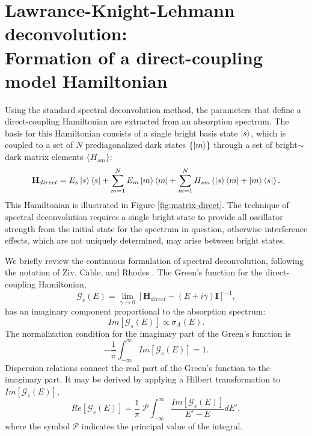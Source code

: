 \documentclass[12pt]{mitthesis}
\begin{document}
\section{Lawrance-Knight-Lehmann deconvolution: \\
  Formation of a direct-coupling model Hamiltonian}

Using the standard spectral deconvolution method, the parameters that define a direct-coupling
Hamiltonian are extracted from an absorption spectrum.  The basis for
this Hamiltonian consists of a single bright basis state $\mathinner{|{s}\rangle}$,
which is coupled to a set of $N$ prediagonalized dark states $\lbrace
\mathinner{|{m}\rangle} \rbrace$ through a set of bright$\sim$dark matrix elements
$\lbrace H_{sm} \rbrace$:
\begin{equation}
  \mathbf{H}_{direct} = 
  E_s\mathinner{|{s}\rangle}\mathinner{\langle{s}|} 
  + \sum_{m=1}^N E_m\mathinner{|{m}\rangle}\mathinner{\langle{m}|}
  + \sum_{m=1}^N H_{sm} \left (
    \mathinner{|{s}\rangle}\mathinner{\langle{m}|} + \mathinner{|{m}\rangle}\mathinner{\langle{s}|}
  \right ).
\end{equation}
This Hamiltonian is illustrated in Figure \ref{fig:matrix-direct}.
The technique of spectral deconvolution requires a single bright state
to provide all oscillator strength from the initial state for the
spectrum in question, otherwise interference effects, which are not
uniquely determined, may arise between bright states.

We briefly review the continuous formulation of spectral
deconvolution, following the notation of Ziv, Cable, and Rhodes
\cite{ziv76, cable80}.  The Green's function for the direct-coupling
Hamiltonian,
\begin{equation}
  \label{eq:greens-function}
  \mathcal{G}_s(E) = 
  \underset{\gamma \rightarrow 0}{\lim}
  [\mathbf{H}_{direct} - (E + i \gamma)\mathbf{I}]^{-1},
\end{equation}
has an imaginary component proportional to the absorption spectrum:
\begin{equation}
  Im[\mathcal{G}_s(E)] \propto \sigma_A (E).
\end{equation}
The normalization condition for the imaginary part of the Green's
function is
\begin{equation}
  - \frac{1}{\pi} \int_{-\infty}^{\infty} Im[\mathcal{G}_s(E)] = 1.
\end{equation}
Dispersion relations connect the real part of the Green's function to
the imaginary part.  It may be derived by applying a Hilbert
transformation to $Im[\mathcal{G}_s(E)]$,
\begin{equation}
  \label{eq:hilbert}
  Re[\mathcal{G}_s(E)] = \frac{1}{\pi} \; 
  \mathcal{P} \int_{-\infty}^{\infty} 
  \frac{Im[\mathcal{G}_s(E)]}{E' - E} dE',
\end{equation}
where the symbol $\mathcal{P}$ indicates the principal value of the
integral.  
\end{document}
